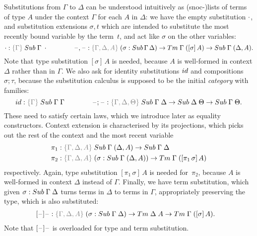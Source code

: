 \documentclass[a4paper,UKenglish,numberwithinsect,cleveref,thm-restate]{lipics-v2021}
\begin{document}
Substitutions from $\Gamma$ to $\Delta$ can be understood intuitively as (snoc-)lists of terms of type $A$ under the context $\Gamma$ for each $A$ in $\Delta$: we have the empty substitution $\cdot$, and substitution extensions $\sigma, t$ which are intended to substitute the most recently bound variable by the term~$t$, and act like $\sigma$ on the other variables:
\[
  \emptysub : \implicit{\Gamma}\;\Sub\;\Gamma\;\emptyctx
  \qquad\qquad
  \blank,\blank : \implicit{\Gamma, \Delta, A}\; (\sigma : \Sub\,\Gamma\,\Delta) \to \Tm\;\Gamma\;([ \sigma ]\, A) \to \Sub\;\Gamma\;(\Delta, A).
\]
Note that type substitution $[\sigma]\,A$ is needed, because $A$ is well-formed in context $\Delta$ rather than in $\Gamma$.
We also ask for identity substitutions $\idS$ and compositions $\sigma;\tau$, because the substitution calculus is supposed to be the initial \emph{category} with families:
\[
  \idS : \implicit{\Gamma}\; \Sub\;\Gamma\;\Gamma
  \qquad\qquad \blank;\blank : \implicit{\Gamma, \Delta, \Theta}\;\Sub\;\Gamma\;\Delta \to \Sub\;\Delta\;\Theta \to \Sub\;\Gamma\;\Theta.
\]
These need to satisfy certain laws, which we introduce later as equality constructors.
Context extension is characterised by its projections, which picks out the rest of the context and the most recent variable
\begin{alignat*}{3}
  \pi_1 & : \implicit{\Gamma, \Delta, A}\;\Sub\;\Gamma\;(\Delta, A) \to \Sub\;\Gamma\;\Delta \\
  \pi_2 & : \implicit{\Gamma, \Delta, A}\;(\sigma : \Sub\;\Gamma\;(\Delta, A)) \to \Tm\;\Gamma\;([ \pi_1\,\sigma ]\, A)
\end{alignat*}
respectively.
Again, type substitution $[\pi_1\,\sigma]\,A$ is needed for~$\pi_2$, because $A$ is well-formed in context $\Delta$ instead of $\Gamma$.
Finally, we have term substitution, which given $\sigma : \Sub\;\Gamma\;\Delta$ turns terms in $\Delta$ to terms in $\Gamma$, appropriately preserving the type, which is also substituted:
\begin{alignat*}{3}
  [\blank] \blank & : \implicit{\Gamma,\Delta, A}\;(\sigma : \Sub\;\Gamma\;\Delta) \to \Tm\;\Delta\;A \to \Tm\;\Gamma\;([\sigma]\, A).
\end{alignat*}
Note that $[\mathord{\hspace{1pt}\text{--}\hspace{1pt}}]\mathord{\hspace{1pt}\text{--}\hspace{1pt}}$ is overloaded for type and term substitution.
\end{document}
